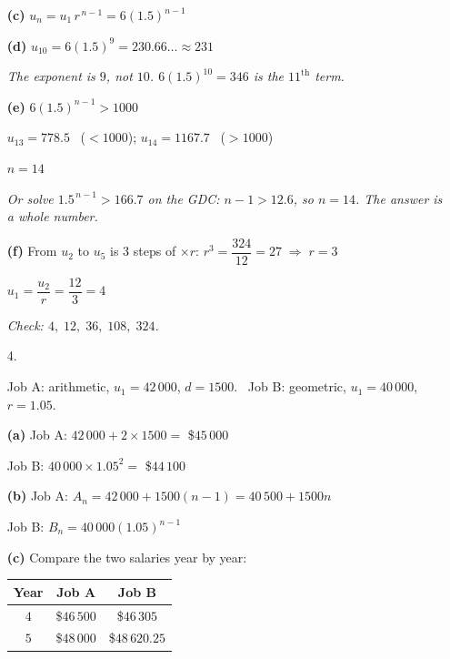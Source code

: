 \documentclass[12pt, twoside]{article}
\begin{document}
\begin{enumerate}[itemsep=0.3cm]
\medskip

\textbf{(c)} $u_{n} = u_{1}\,r^{\,n - 1} = 6(1.5)^{n - 1}$

\medskip

\textbf{(d)} $u_{10} = 6(1.5)^{9} = 230.66\ldots \approx 231$

\emph{The exponent is $9$, not $10$. $6(1.5)^{10} = 346$ is the
$11^{\text{th}}$ term.}

\medskip

\textbf{(e)} $6(1.5)^{n - 1} > 1000$

$u_{13} = 778.5$ \ ($< 1000$); \quad $u_{14} = 1167.7$ \ ($> 1000$)

$n = 14$

\emph{Or solve $1.5^{\,n - 1} > 166.7$ on the GDC: $n - 1 > 12.6$, so
$n = 14$. The answer is a whole number.}

\medskip

\textbf{(f)} From $u_{2}$ to $u_{5}$ is $3$ steps of $\times r$:
$r^{3} = \dfrac{324}{12} = 27 \;\Rightarrow\; r = 3$

$u_{1} = \dfrac{u_{2}}{r} = \dfrac{12}{3} = 4$

\emph{Check: $4,\; 12,\; 36,\; 108,\; 324$.}

\newpage

\item[4.]

Job A: arithmetic, $u_{1} = 42\,000$, $d = 1500$. \ Job B: geometric,
$u_{1} = 40\,000$, $r = 1.05$.

\medskip

\textbf{(a)} Job A: $42\,000 + 2 \times 1500 = $ \$$45\,000$

Job B: $40\,000 \times 1.05^{2} = $ \$$44\,100$

\medskip

\textbf{(b)} Job A: $A_{n} = 42\,000 + 1500(n - 1) = 40\,500 + 1500n$

Job B: $B_{n} = 40\,000(1.05)^{n - 1}$

\medskip

\textbf{(c)} Compare the two salaries year by year:

\begin{tabular}{ccc}
Year & Job A & Job B \\
\hline
$4$ & \$$46\,500$ & \$$46\,305$ \\
$5$ & \$$48\,000$ & \$$48\,620.25$ \\
\end{tabular}


\end{enumerate}
\end{document}
